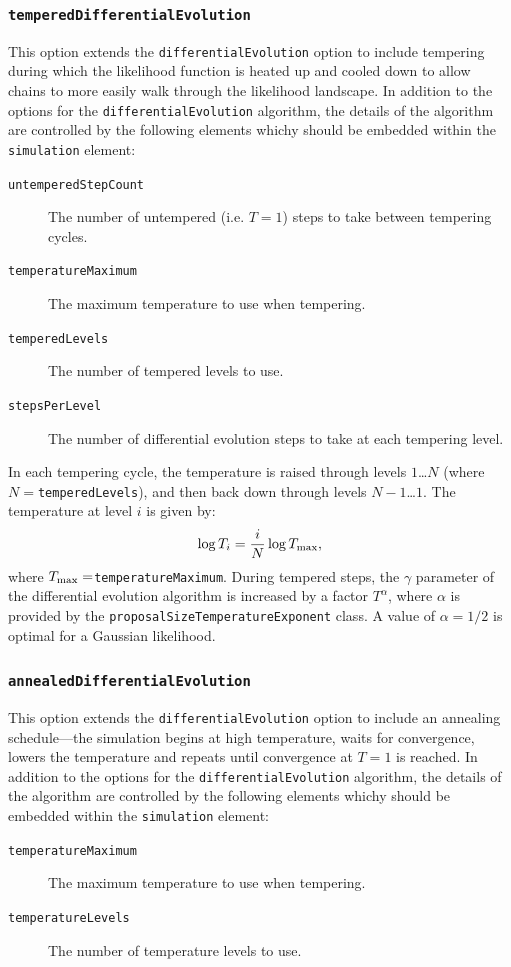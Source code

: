 \subsubsection{{\tt temperedDifferentialEvolution}}

This option extends the {\tt differentialEvolution} option to include tempering during which the likelihood function is heated up and cooled down to allow chains to more easily walk through the likelihood landscape. In addition to the options for the {\tt differentialEvolution} algorithm, the details of the algorithm are controlled by the following elements whichy should be embedded within the {\tt simulation} element:
\begin{description}
\item[{\tt untemperedStepCount}] The number of untempered (i.e. $T=1$) steps to take between tempering cycles.
\item[{\tt temperatureMaximum}] The maximum temperature to use when tempering.
\item[{\tt temperedLevels}] The number of tempered levels to use.
\item[{\tt stepsPerLevel}] The number of differential evolution steps to take at each tempering level.
\end{description}

In each tempering cycle, the temperature is raised through levels $1$\ldots$N$ (where $N=${\tt temperedLevels}), and then back down through levels $N-1$\ldots$1$. The temperature at level $i$ is given by:
\begin{equation}
\log T_i = {i \over N} \log T_{\rm max},
\end{equation}
where $T_{\rm max}=${\tt temperatureMaximum}. During tempered steps, the $\gamma$ parameter of the differential evolution algorithm is increased by a factor $T^\alpha$, where $\alpha$ is provided by the {\tt proposalSizeTemperatureExponent} class. A value of $\alpha=1/2$ is optimal for a Gaussian likelihood.

\subsubsection{{\tt annealedDifferentialEvolution}}

This option extends the {\tt differentialEvolution} option to include an annealing schedule---the simulation begins at high temperature, waits for convergence, lowers the temperature and repeats until convergence at $T=1$ is reached. In addition to the options for the {\tt differentialEvolution} algorithm, the details of the algorithm are controlled by the following elements whichy should be embedded within the {\tt simulation} element:
\begin{description}
\item[{\tt temperatureMaximum}] The maximum temperature to use when tempering.
\item[{\tt temperatureLevels}] The number of temperature levels to use.
\end{description}

